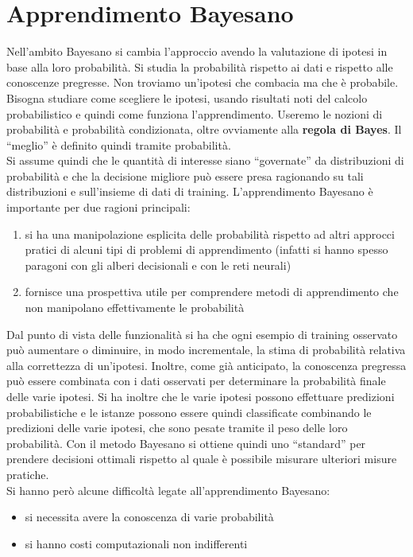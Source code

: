 \chapter{Apprendimento Bayesano}
\label{Capitolo 4}
Nell'ambito Bayesano si cambia l'approccio avendo la valutazione di ipotesi in
base alla loro probabilità. Si studia la probabilità rispetto ai dati e rispetto
alle conoscenze pregresse. Non troviamo un'ipotesi che combacia ma che è
probabile.\\
Bisogna studiare come scegliere le ipotesi, usando risultati noti del calcolo
probabilistico e quindi come funziona l'apprendimento. Useremo le nozioni di
probabilità e probabilità condizionata, oltre ovviamente alla \textbf{regola di
  Bayes}. Il ``meglio'' è definito quindi tramite probabilità.\\
Si assume quindi che le quantità di interesse siano ``governate'' da
distribuzioni di probabilità e che la decisione migliore può essere presa
ragionando su tali distribuzioni e sull'insieme di dati di
training. L'apprendimento Bayesano è importante per due ragioni principali:
\begin{enumerate}
  \item si ha una manipolazione esplicita delle probabilità rispetto ad altri
  approcci pratici di alcuni tipi di problemi di apprendimento (infatti si hanno
  spesso paragoni con gli alberi decisionali e con le reti neurali)
  \item fornisce una prospettiva utile per comprendere metodi di apprendimento
  che non manipolano effettivamente le probabilità
\end{enumerate}
Dal punto di vista delle funzionalità si ha che ogni esempio di training
osservato può aumentare o diminuire, in modo incrementale, la stima di
probabilità relativa alla correttezza di un'ipotesi. Inoltre, come già
anticipato, la conoscenza pregressa può essere combinata con i dati osservati
per determinare la probabilità finale delle varie ipotesi. Si ha inoltre che le
varie ipotesi possono effettuare predizioni probabilistiche e le istanze possono
essere quindi classificate combinando le predizioni delle varie ipotesi, che
sono pesate tramite il peso delle loro probabilità. Con il metodo Bayesano si
ottiene quindi uno ``standard'' per prendere decisioni ottimali rispetto al
quale è possibile misurare ulteriori misure pratiche.\\
Si hanno però alcune difficoltà legate all'apprendimento Bayesano:
\begin{itemize}
  \item si necessita avere la conoscenza di varie probabilità
  \item si hanno costi computazionali non indifferenti
\end{itemize}
